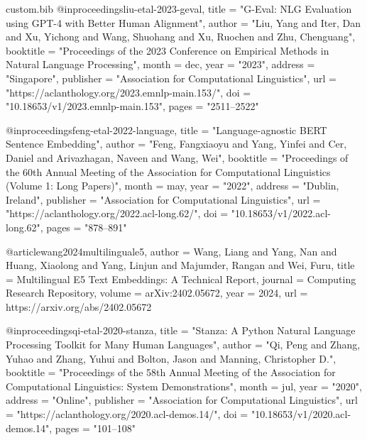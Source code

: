 \begin{filecontents*}[overwrite]{custom.bib}
@inproceedings{liu-etal-2023-geval,
    title     = "{G}-{E}val: {NLG} Evaluation using {GPT}-4 with Better Human Alignment",
    author    = "Liu, Yang  and
      Iter, Dan  and
      Xu, Yichong  and
      Wang, Shuohang  and
      Xu, Ruochen  and
      Zhu, Chenguang",
    booktitle = "Proceedings of the 2023 Conference on Empirical Methods in Natural Language Processing",
    month     = dec,
    year      = "2023",
    address   = "Singapore",
    publisher = "Association for Computational Linguistics",
    url       = "https://aclanthology.org/2023.emnlp-main.153/",
    doi       = "10.18653/v1/2023.emnlp-main.153",
    pages     = "2511--2522"
}

@inproceedings{feng-etal-2022-language,
    title     = "Language-agnostic {BERT} Sentence Embedding",
    author    = "Feng, Fangxiaoyu  and
      Yang, Yinfei  and
      Cer, Daniel  and
      Arivazhagan, Naveen  and
      Wang, Wei",
    booktitle = "Proceedings of the 60th Annual Meeting of the Association for Computational Linguistics (Volume 1: Long Papers)",
    month     = may,
    year      = "2022",
    address   = "Dublin, Ireland",
    publisher = "Association for Computational Linguistics",
    url       = "https://aclanthology.org/2022.acl-long.62/",
    doi       = "10.18653/v1/2022.acl-long.62",
    pages     = "878--891"
}

@article{wang2024multilinguale5,
    author  = {Wang, Liang and Yang, Nan and Huang, Xiaolong and Yang, Linjun and Majumder, Rangan and Wei, Furu},
    title   = {Multilingual {E}5 Text Embeddings: A Technical Report},
    journal = {Computing Research Repository},
    volume  = {arXiv:2402.05672},
    year    = {2024},
    url     = {https://arxiv.org/abs/2402.05672}
}

@inproceedings{qi-etal-2020-stanza,
    title     = "{S}tanza: A {P}ython Natural Language Processing Toolkit for Many Human Languages",
    author    = "Qi, Peng  and
      Zhang, Yuhao  and
      Zhang, Yuhui  and
      Bolton, Jason  and
      Manning, Christopher D.",
    booktitle = "Proceedings of the 58th Annual Meeting of the Association for Computational Linguistics: System Demonstrations",
    month     = jul,
    year      = "2020",
    address   = "Online",
    publisher = "Association for Computational Linguistics",
    url       = "https://aclanthology.org/2020.acl-demos.14/",
    doi       = "10.18653/v1/2020.acl-demos.14",
    pages     = "101--108"
}


\end{filecontents*}
